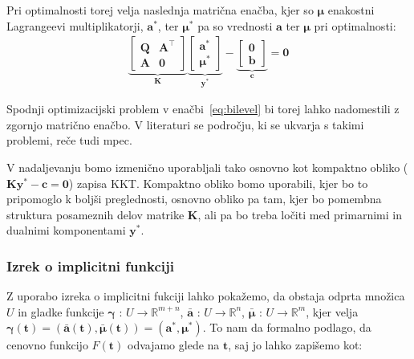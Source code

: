 \documentclass[mat2, tisk]{fmfdelo}
\newcommand{\R}{\mathbb R}
\newcommand{\aimplicit}{\bar{\mathbf{a}}}
\newcommand{\muimplicit}{\bar{\mathbf{\mu}}}
\newcommand{\yimplicit}{\mathbf{\gamma}}
\newcommand{\qmat}{\mathbf{Q}}
\newcommand{\amat}{\mathbf{A}}
\newcommand{\kmat}{\mathbf{K}}
\newcommand{\bvec}{\mathbf{b}}
\newcommand{\avec}{\mathbf{a}}
\newcommand{\tvec}{\mathbf{t}}
\newcommand{\muvec}{\boldsymbol{\mu}}
\begin{document}
Pri optimalnosti torej velja naslednja matrična enačba, kjer so $\mathbf{\mu}$ enakostni Lagrangeevi multiplikatorji, $\mathbf{a^*}$, ter $\mathbf{\mu^*}$ pa so vrednosti $\mathbf{a}$ ter $\mathbf{\mu}$ pri optimalnosti:
\begin{equation}
    \label{eq:kkt_matrix}
    \begin{gathered}
        \underbrace{
            \begin{bmatrix}
                \qmat & \amat^{\top} \\
                \amat & \mathbf{0}
            \end{bmatrix}
        }_{\kmat}
        \underbrace{
            \begin{bmatrix}
                \avec^* \\
                \boldsymbol{\mu}^*
            \end{bmatrix}
        }_{\mathbf{y}^*}
        -
        \underbrace{
            \begin{bmatrix}
                \mathbf{0} \\
                \bvec
            \end{bmatrix}
        }_{\mathbf{c}}
        = \mathbf{0}
    \end{gathered}
\end{equation}

Spodnji optimizacijski problem v enačbi~\eqref{eq:bilevel} bi torej lahko nadomestili z zgornjo matrično enačbo. V literaturi se področju, ki se ukvarja s takimi problemi, reče tudi \acl{mpec}.

V nadaljevanju bomo izmenično uporabljali tako osnovno kot kompaktno obliko ($\kmat \mathbf{y}^* - \mathbf{c} = \mathbf{0}$) zapisa \ac{KKT}. Kompaktno obliko bomo uporabili, kjer bo to pripomoglo k boljši preglednosti, osnovno obliko pa tam, kjer bo pomembna struktura posameznih delov matrike $\kmat$, ali pa bo treba ločiti med primarnimi in dualnimi komponentami $\mathbf{y}^*$.

\subsubsection{Izrek o implicitni funkciji}
\label{sec:ift}

Z uporabo izreka o implicitni fukciji lahko pokažemo, da obstaja odprta množica $U$ in gladke funkcije $\yimplicit$ : $U \to \R^{m+n}$, $\aimplicit$ : $U \to \R^{n}$, $\muimplicit$ : $U \to \R^{m}$, kjer velja $\yimplicit(\tvec) = (\aimplicit(\tvec), \muimplicit(\tvec)) = (\avec^*, \muvec^*)$. To nam da formalno podlago, da cenovno funkcijo $F(\tvec)$ odvajamo glede na $\tvec$, saj jo lahko zapišemo kot:
\end{document}

